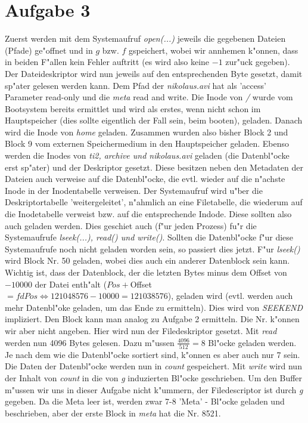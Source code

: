 \documentclass{ti2}
\newcommand{\mm}{\emph}
\begin{document}
\section*{Aufgabe 3}
Zuerst werden mit dem Systemaufruf \mm{open(...)} jeweils die gegebenen Dateien (Pfade) ge"offnet und in $g$ bzw. $f$ gspeichert, wobei wir annhemen k"onnen, dass in beiden F"allen kein Fehler auftritt (es wird also keine $-1$ zur"uck gegeben). Der Dateideskriptor wird nun jeweils auf den entsprechenden Byte gesetzt, damit sp"ater gelesen werden kann. Dem Pfad der \mm{nikolaus.avi} hat als 'access' Parameter read-only und die \mm{meta} read and write. Die Inode von \mm{/} wurde vom Bootsystem bereits ermittlet und wird als erstes, wenn nicht schon im Hauptspeicher (dies sollte eigentlich der Fall sein, beim booten), geladen. Danach wird die Inode von \mm{home} geladen. Zusammen wurden also bisher Block 2 und Block 9 vom externen Speichermedium in den Hauptspeicher geladen. Ebenso werden die Inodes von \mm{ti2, archive und nikolaus.avi} geladen (die Datenbl"ocke erst sp"ater) und der Deskriptor gesetzt. Diese besitzen neben den Metadaten der Dateien auch verweise auf die Datenbl"ocke, die evtl. wieder auf die n"achste Inode in der Inodentabelle verweisen. Der Systemaufruf wird u"ber die Deskriptortabelle 'weitergeleitet', n"ahmlich an eine Filetabelle, die wiederum auf die Inodetabelle verweist bzw. auf die entsprechende Indode. Diese sollten also auch geladen werden. Dies geschiet auch (f"ur jeden Prozess) fu"r die Systemaufrufe \mm{lseek(...), read() und write()}. Sollten die Datenbl"ocke f"ur diese Systemaufrufe noch nicht geladen worden sein, so passiert dies jetzt. F"ur \mm{lseek()} wird Block Nr. 50 geladen, wobei dies auch ein anderer Datenblock  sein kann. Wichtig ist, dass der Datenblock, der die letzten Bytes minus dem Offset von $-10000$ der Datei enth"alt ($Pos + $Offset$ = fdPos \Leftrightarrow 12 1048576 - 10000 = 121038576$), geladen wird (evtl. werden auch mehr Datenbl"oke geladen, um das Ende zu ermitteln). Dies wird von \mm{SEEKEND} impliziert. Den Block kann man analog zu Aufgabe 2 ermitteln. Die Nr. k"onnen wir aber nicht angeben. Hier wird nun der Filedeskriptor gesetzt. Mit \mm{read} werden nun 4096 Bytes gelesen. Dazu m"ussen $\frac{4096}{512}=8$ Bl"ocke geladen werden. Je nach dem wie die Datenbl"ocke sortiert sind, k"onnen es aber auch nur 7 sein. Die Daten der Datenbl"ocke werden nun in \mm{count} gespeichert. Mit  \mm{write} wird nun der Inhalt von \mm{count} in die von \mm{g} induzierten Bl"ocke geschrieben. Um den Buffer m"ussen wir uns in dieser Aufgabe nicht k"ummern, der Filedescriptor ist durch \mm{g} gegeben. Da die Meta leer ist, werden zwar 7-8 'Meta' -  Bl"ocke geladen und beschrieben, aber der erste Block in \mm{meta} hat die Nr. 8521.
\end{document}
